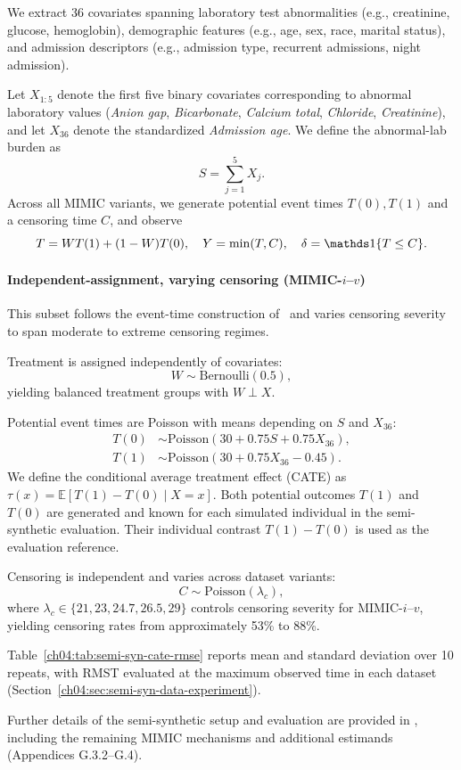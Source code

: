 We extract 36 covariates spanning laboratory test abnormalities (e.g., creatinine, glucose, hemoglobin), demographic features (e.g., age, sex, race, marital status), and admission descriptors (e.g., admission type, recurrent admissions, night admission).

Let $X_{1:5}$ denote the first five binary covariates corresponding to abnormal laboratory values
(\textit{Anion gap}, \textit{Bicarbonate}, \textit{Calcium total}, \textit{Chloride}, \textit{Creatinine}),
and let $X_{36}$ denote the standardized \textit{Admission age}.
We define the abnormal-lab burden as
\[
S = \sum_{j=1}^{5} X_j.
\]
Across all MIMIC variants, we generate potential event times $T(0),T(1)$ and a censoring time $C$, and observe
\[
T = W T(1) + (1-W)T(0),\quad Y=\min(T,C),\quad \delta=\ChFourInd\{T\le C\}.
\]


\paragraph{Independent-assignment, varying censoring (MIMIC-$i$--$v$)}
\label{ch04:app:mimic-i-v}
This subset follows the event-time construction of~\citet{meir2025heterogeneous} and varies censoring severity to span moderate to extreme censoring regimes.

Treatment is assigned independently of covariates:
\[
W \sim \mathrm{Bernoulli}(0.5),
\]
yielding balanced treatment groups with $W \perp X$.

Potential event times are Poisson with means depending on $S$ and $X_{36}$:
\begin{align*}
    T(0) &\sim \mathrm{Poisson}\!\left(30 + 0.75 S + 0.75 X_{36}\right), \\
    T(1) &\sim \mathrm{Poisson}\!\left(30 + 0.75 X_{36} - 0.45\right).
\end{align*}
We define the conditional average treatment effect (CATE) as $\tau(x)=\mathbb{E}[T(1)-T(0)\mid X=x]$.
Both potential outcomes $T(1)$ and $T(0)$ are generated and known for each simulated individual in the semi-synthetic evaluation.
Their individual contrast $T(1)-T(0)$ is used as the evaluation reference.

Censoring is independent and varies across dataset variants:
\[
C \sim \mathrm{Poisson}(\lambda_c),
\]
where $\lambda_c \in \{21, 23, 24.7, 26.5, 29\}$ controls censoring severity for MIMIC-$i$--$v$, yielding censoring rates from approximately 53\% to 88\%.

Table~\ref{ch04:tab:semi-syn-cate-rmse} reports mean and standard deviation over 10 repeats, with RMST evaluated at the maximum observed time in each dataset (Section~\ref{ch04:sec:semi-syn-data-experiment}).

Further details of the semi-synthetic setup and evaluation are provided in \citet[Section 4.2 and Appendix G]{noroozizadeh2026survhte}, including the remaining MIMIC mechanisms and additional estimands (Appendices G.3.2--G.4).
